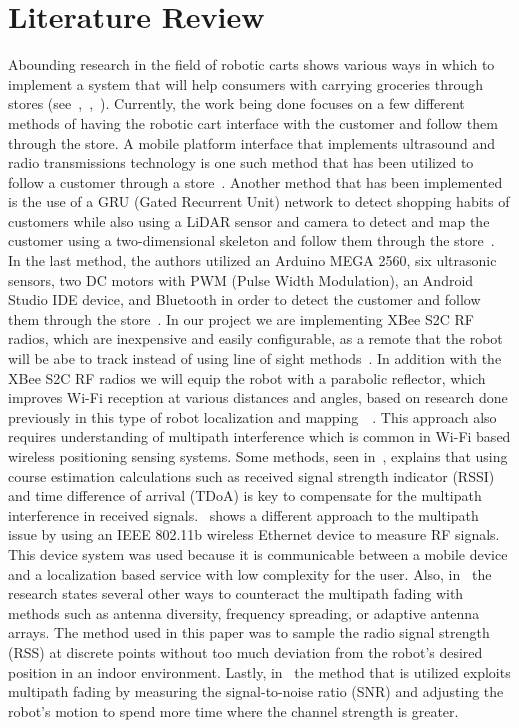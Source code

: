 \documentclass[letterpaper,12pt]{article}   %
\begin{document}
\section{Literature Review} %

Abounding research in the field of robotic carts shows various ways in which to implement a system that will help consumers with carrying groceries through stores (see~\cite{inproceedings},~\cite{islam_lam_fukuda_kobayashi_kuno_2019},~\cite{article}). Currently, the work being done focuses on a few different methods of having the robotic cart interface with the customer and follow them through the store. A mobile platform interface that implements ultrasound and radio transmissions technology is one such method that has been utilized to follow a customer through a store~\cite{article}. Another method that has been implemented is the use of a GRU (Gated Recurrent Unit) network to detect shopping habits of customers while also using a LiDAR sensor and camera to detect and map the customer using a two-dimensional skeleton and follow them through the store~\cite{islam_lam_fukuda_kobayashi_kuno_2019}. In the last method, the authors utilized an Arduino MEGA 2560, six ultrasonic sensors, two DC motors with PWM (Pulse Width Modulation), an Android Studio IDE device, and Bluetooth in order to detect the customer and follow them through the store~\cite{inproceedings}. In our project we are implementing XBee S2C RF radios, which are inexpensive and easily configurable, as a remote that the robot will be abe to track instead of using line of sight methods~\cite{8168364}. In addition with the XBee S2C RF radios we will equip the robot with a parabolic reflector, which improves Wi-Fi reception at various distances and angles, based on research done previously in this type of robot localization and mapping~\cite{8168364}~\cite{Li2013ANA}. This approach also requires understanding of multipath interference which is common in Wi-Fi based wireless positioning sensing systems. Some methods, seen in~\cite{xie_jiang_zhao_zhang_2019}, explains that using course estimation calculations such as received signal strength indicator (RSSI) and time difference of arrival (TDoA) is key to compensate for the multipath interference in received signals.~\cite{ladd_bekris_rudys_kavraki_wallach_2005} shows a different approach to the multipath issue by using an IEEE 802.11b wireless Ethernet device to measure RF signals. This device system was used because it is communicable between a mobile device and a localization based service with low complexity for the user. Also, in~\cite{lindhe_johansson_bicchi_2007} the research states several other ways to counteract the multipath fading with methods such as antenna diversity, frequency spreading, or adaptive antenna arrays. The method used in this paper was to sample the radio signal strength (RSS) at discrete points without too much deviation from the robot's desired position in an indoor environment. Lastly, in~\cite{Lindhe2009} the method that is utilized exploits multipath fading by measuring the signal-to-noise ratio (SNR) and adjusting the robot's motion to spend more time where the channel strength is greater.
\end{document}
